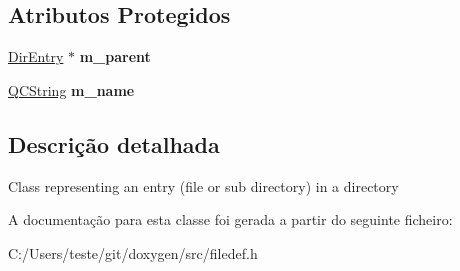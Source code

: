 \subsection*{Atributos Protegidos}
\begin{DoxyCompactItemize}
\item 
\hypertarget{class_dir_entry_ae299cbbaa468775d17cfff33e149236b}{\hyperlink{class_dir_entry}{Dir\-Entry} $\ast$ {\bfseries m\-\_\-parent}}\label{class_dir_entry_ae299cbbaa468775d17cfff33e149236b}

\item 
\hypertarget{class_dir_entry_a1deac18ce5712c20300cdf5e6e7d5487}{\hyperlink{class_q_c_string}{Q\-C\-String} {\bfseries m\-\_\-name}}\label{class_dir_entry_a1deac18ce5712c20300cdf5e6e7d5487}

\end{DoxyCompactItemize}


\subsection{Descrição detalhada}
Class representing an entry (file or sub directory) in a directory 

A documentação para esta classe foi gerada a partir do seguinte ficheiro\-:\begin{DoxyCompactItemize}
\item 
C\-:/\-Users/teste/git/doxygen/src/filedef.\-h\end{DoxyCompactItemize}
